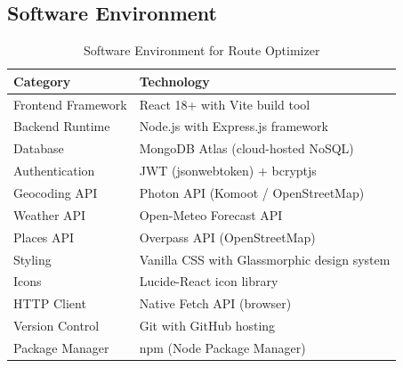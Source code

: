 \subsection{Software Environment}
\begin{table}[H]
    \centering
    \renewcommand{\arraystretch}{1.4}
    \begin{tabular}{|p{4cm}|p{9cm}|}
        \hline
        \textbf{Category} & \textbf{Technology} \\
        \hline
        Frontend Framework & React 18+ with Vite build tool \\
        \hline
        Backend Runtime & Node.js with Express.js framework \\
        \hline
        Database & MongoDB Atlas (cloud-hosted NoSQL) \\
        \hline
        Authentication & JWT (jsonwebtoken) + bcryptjs \\
        \hline
        Geocoding API & Photon API (Komoot / OpenStreetMap) \\
        \hline
        Weather API & Open-Meteo Forecast API \\
        \hline
        Places API & Overpass API (OpenStreetMap) \\
        \hline
        Styling & Vanilla CSS with Glassmorphic design system \\
        \hline
        Icons & Lucide-React icon library \\
        \hline
        HTTP Client & Native Fetch API (browser) \\
        \hline
        Version Control & Git with GitHub hosting \\
        \hline
        Package Manager & npm (Node Package Manager) \\
        \hline
    \end{tabular}
    \caption{Software Environment for Route Optimizer}
    \label{tab:software_env}
\end{table}

